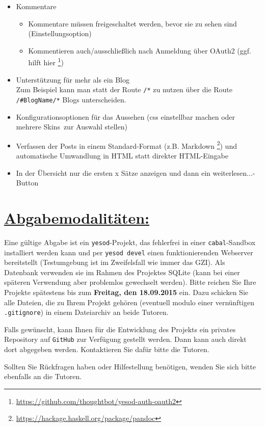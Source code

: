 \documentclass[10pt,a4paper]{article}
\begin{document}
\begin{itemize}
 \item Kommentare
       \begin{itemize}
        \item Kommentare müssen freigeschaltet werden, bevor sie zu sehen sind (Einstellungsoption)
        \item Kommentieren auch/ausschließlich nach Anmeldung über OAuth2 (ggf. hilft hier \footnote{\url{https://github.com/thoughtbot/yesod-auth-oauth2}})
       \end{itemize}
 \item Unterstützung für mehr als ein Blog\\
       Zum Beispiel kann man statt der Route \texttt{/*} zu nutzen über die Route \texttt{/\#BlogName/*} Blogs unterscheiden.
 \item Konfigurationsoptionen für das Aussehen (css einstellbar machen oder mehrere \glqq Skins\grqq \ zur Auswahl stellen)
 \item Verfassen der Posts in einem Standard-Format (z.B. Markdown \footnote{\url{https://hackage.haskell.org/package/pandoc}}) und automatische Umwandlung in HTML statt direkter HTML-Eingabe
 \item In der Übersicht nur die ersten x Sätze anzeigen und dann ein \glqq weiterlesen...\grqq-Button
\end{itemize}

\section*{\underline{Abgabemodalitäten:}}

Eine gültige Abgabe ist ein \texttt{yesod}-Projekt, das fehlerfrei in einer \texttt{cabal}-Sandbox installiert werden kann und per \texttt{yesod devel} einen funktionierenden Webserver bereitstellt (Testumgebung ist im Zweifelsfall wie immer das GZI). Als Datenbank verwenden sie im Rahmen des Projektes SQLite (kann bei einer späteren Verwendung aber problemlos gewechselt werden). Bitte reichen Sie Ihre Projekte spätestens bis zum \textbf{Freitag, den 18.09.2015} ein.
Dazu schicken Sie alle Dateien, die zu Ihrem Projekt gehören (eventuell modulo einer vernünftigen \texttt{.gitignore}) in einem Dateiarchiv an beide Tutoren.\bigskip

Falls gewünscht, kann Ihnen für die Entwicklung des Projekts ein privates Repository auf \texttt{GitHub} zur Verfügung gestellt werden. Dann kann auch direkt dort abgegeben werden. Kontaktieren Sie dafür bitte die Tutoren.\bigskip

Sollten Sie Rückfragen haben oder Hilfestellung benötigen, wenden Sie sich bitte ebenfalls an die Tutoren.
\end{document}
